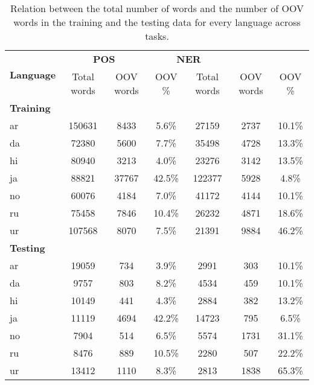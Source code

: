 \begin{table}[h!]
    \centering
    \begin{tabular}{l c c c|c c c}
        \toprule
        \multirow{2}{*}{\bfseries Language} &
        \multicolumn{2}{c}{\bfseries POS} &
        \multicolumn{2}{c}{\bfseries NER} \\

        \cmidrule(lr){2-7}
        & Total words & OOV words & OOV \%
        & Total words & OOV words & OOV \% \\

        \cmidrule(lr){1-7}
        \multicolumn{7}{l}{\bfseries Training} \\

        \cmidrule(lr){1-7}
        ar & 150631 &  8433 &  5.6\% &  27159 & 2737 & 10.1\% \\
        da &  72380 &  5600 &  7.7\% &  35498 & 4728 & 13.3\% \\
        hi &  80940 &  3213 &  4.0\% &  23276 & 3142 & 13.5\% \\
        ja &  88821 & 37767 & 42.5\% & 122377 & 5928 &  4.8\% \\
        no &  60076 &  4184 &  7.0\% &  41172 & 4144 & 10.1\% \\
        ru &  75458 &  7846 & 10.4\% &  26232 & 4871 & 18.6\% \\
        ur & 107568 &  8070 &  7.5\% &  21391 & 9884 & 46.2\% \\

        \cmidrule(lr){1-7}
        \multicolumn{7}{l}{\bfseries Testing} \\

        \cmidrule(lr){1-7}
        ar & 19059 &  734 &  3.9\% &  2991 &  303 & 10.1\% \\
        da &  9757 &  803 &  8.2\% &  4534 &  459 & 10.1\% \\
        hi & 10149 &  441 &  4.3\% &  2884 &  382 & 13.2\% \\
        ja & 11119 & 4694 & 42.2\% & 14723 &  795 &  6.5\% \\
        no &  7904 &  514 &  6.5\% &  5574 & 1731 & 31.1\% \\
        ru &  8476 &  889 & 10.5\% &  2280 &  507 & 22.2\% \\
        ur & 13412 & 1110 &  8.3\% &  2813 & 1838 & 65.3\% \\

        \bottomrule
    \end{tabular}
    \caption{Relation between the total number of words and the number of OOV words
        in the training and the testing data for every language across tasks.
    }\label{table:oov-percentages-total}
\end{table}



\pagebreak
